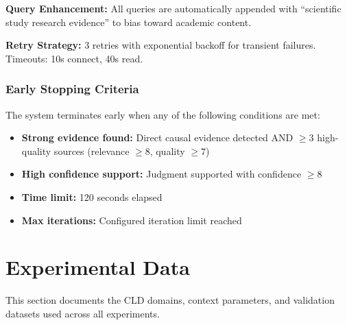 \textbf{Query Enhancement:} All queries are automatically appended with ``scientific study research evidence'' to bias toward academic content.

\textbf{Retry Strategy:} 3 retries with exponential backoff for transient failures. Timeouts: 10s connect, 40s read.

\subsubsection{Early Stopping Criteria}

The system terminates early when any of the following conditions are met:
\begin{itemize}[noitemsep]
    \item \textbf{Strong evidence found:} Direct causal evidence detected AND $\geq$3 high-quality sources (relevance $\geq 8$, quality $\geq 7$)
    \item \textbf{High confidence support:} Judgment supported with confidence $\geq 8$
    \item \textbf{Time limit:} 120 seconds elapsed
    \item \textbf{Max iterations:} Configured iteration limit reached
\end{itemize}

\section{Experimental Data}
\label{sec:experimental_data}

This section documents the CLD domains, context parameters, and validation datasets used across all experiments.

